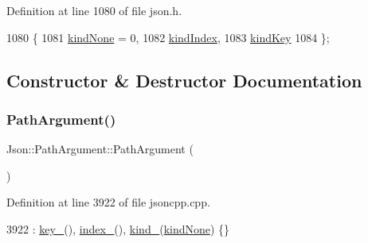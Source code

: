 Definition at line 1080 of file json.\+h.


\begin{DoxyCode}
1080             \{
1081     \hyperlink{class_json_1_1_path_argument_a2420bbad778573c147e578701b84d9b9afa8c7a261ccb8ae5171d2372321c2698}{kindNone} = 0,
1082     \hyperlink{class_json_1_1_path_argument_a2420bbad778573c147e578701b84d9b9ae5a976b898111903334cb131f5e03dc4}{kindIndex},
1083     \hyperlink{class_json_1_1_path_argument_a2420bbad778573c147e578701b84d9b9a74f5968d06c01701b7a46092c33ba7d1}{kindKey}
1084   \};
\end{DoxyCode}


\subsection{Constructor \& Destructor Documentation}
\mbox{\label{class_json_1_1_path_argument_a3c96ed20c56a55eb76d37a11553c528e}} 
\subsubsection{\texorpdfstring{Path\+Argument()}{PathArgument()}\hspace{0.1cm}{\footnotesize\ttfamily [1/4]}}
{\footnotesize\ttfamily Json\+::\+Path\+Argument\+::\+Path\+Argument (\begin{DoxyParamCaption}{ }\end{DoxyParamCaption})}



Definition at line 3922 of file jsoncpp.\+cpp.


\begin{DoxyCode}
3922 : \hyperlink{class_json_1_1_path_argument_af4024368548ff730ef2bed97d6f1ca43}{key\_}(), \hyperlink{class_json_1_1_path_argument_afd5857d1b6bfaae6961333bdae7bd5ec}{index\_}(), \hyperlink{class_json_1_1_path_argument_ad4bc4b544b155a3d9c7788572ecf991b}{kind\_}(\hyperlink{class_json_1_1_path_argument_a2420bbad778573c147e578701b84d9b9afa8c7a261ccb8ae5171d2372321c2698}{kindNone}) \{\}
\end{DoxyCode}
\mbox{\label{class_json_1_1_path_argument_a53c5b27143b161301b95fd544c139ecf}} 
